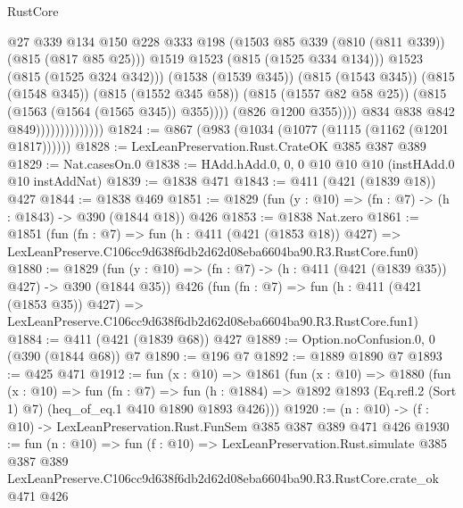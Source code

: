 \begin{lexlean}{RustCore}
\begin{coremodule}
                                              @27
                                              @339
                                              @134
                                              @150
                                              @228
                                              @333
                                              @198
                                              (@1503
                                                @85
                                                @339
                                                (@810 (@811 @339))
                                                (@815 (@817 @85 @25)))
                                              @1519
                                              @1523
                                              (@815 (@1525 @334 @134)))
                                            @1523
                                            (@815 (@1525 @324 @342)))
                                          (@1538 (@1539 @345))
                                          (@815 (@1543 @345))
                                          (@815 (@1548 @345))
                                          (@815 (@1552 @345 @58))
                                          (@815 (@1557 @82 @58 @25))
                                          (@815 (@1563 (@1564 (@1565 @345)) @355))))
                                      (@826 @1200 @355))))
                                @834
                                @838
                                @842
                                @849))))))))))))))
@1824 := @867 (@983 (@1034 (@1077 (@1115 (@1162 (@1201 @1817))))))
@1828 := LexLeanPreservation.Rust.CrateOK @385 @387 @389
@1829 := Nat.casesOn.{0}
@1838 := HAdd.hAdd.{0, 0, 0} @10 @10 @10 (instHAdd.{0} @10 instAddNat)
@1839 := @1838 @471
@1843 := @411 (@421 (@1839 @18)) @427
@1844 := @1838 @469
@1851 := @1829 (fun (y : @10) => (fn : @7) -> (h : @1843) -> @390 (@1844 @18)) @426
@1853 := @1838 Nat.zero
@1861 := @1851
    (fun (fn : @7) =>
    fun (h : @411 (@421 (@1853 @18)) @427) =>
    LexLeanPreserve.C106cc9d638f6db2d62d08eba6604ba90.R3.RustCore.fun0)
@1880 := @1829
    (fun (y : @10) => (fn : @7) -> (h : @411 (@421 (@1839 @35)) @427) -> @390 (@1844 @35))
    @426
    (fun (fn : @7) =>
    fun (h : @411 (@421 (@1853 @35)) @427) =>
    LexLeanPreserve.C106cc9d638f6db2d62d08eba6604ba90.R3.RustCore.fun1)
@1884 := @411 (@421 (@1839 @68)) @427
@1889 := Option.noConfusion.{0, 0} (@390 (@1844 @68)) @7
@1890 := @196 @7
@1892 := @1889 @1890 @7
@1893 := @425 @471
@1912 := fun (x : @10) =>
  @1861
    (fun (x : @10) =>
    @1880
      (fun (x : @10) =>
      fun (fn : @7) =>
      fun (h : @1884) =>
      @1892 @1893 (Eq.refl.{2} (Sort 1) @7) (heq_of_eq.{1} @410 @1890 @1893 @426)))
@1920 := (n : @10) -> (f : @10) -> LexLeanPreservation.Rust.FunSem @385 @387 @389 @471 @426
@1930 := fun (n : @10) =>
  fun (f : @10) =>
  LexLeanPreservation.Rust.simulate
    @385
    @387
    @389
    LexLeanPreserve.C106cc9d638f6db2d62d08eba6604ba90.R3.RustCore.crate_ok
    @471
    @426
\end{coremodule}
\end{lexlean}
